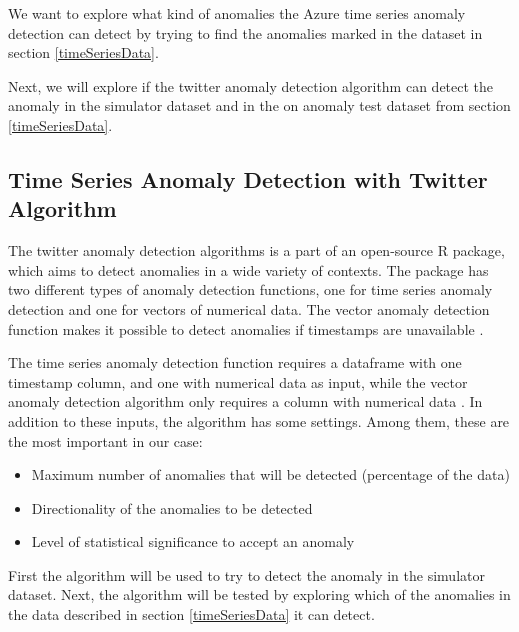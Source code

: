 \documentclass[english, a4paper]{report}
\begin{document}
{{{            We want to explore what kind of anomalies the Azure time series anomaly detection can detect by trying to find the anomalies marked in the dataset in section \ref{timeSeriesData}. 
            \par
            Next, we will explore if the twitter anomaly detection algorithm can detect the anomaly in the simulator dataset and in the on anomaly test dataset from section \ref{timeSeriesData}.
        }
            
        \subsection{Time Series Anomaly Detection with Twitter Algorithm} \label{timeSeriesADTwitter}
        {
            The twitter anomaly detection algorithms is a part of an open-source R package, which aims to detect anomalies in a wide variety of contexts. The package has two different types of anomaly detection functions, one for time series anomaly detection and one for vectors of numerical data. The vector anomaly detection function makes it possible to detect anomalies if timestamps are unavailable \cite{twitterGitHub}. 
            \par
            The time series anomaly detection function requires a dataframe with one timestamp column, and one with numerical data as input, while the vector anomaly detection algorithm only requires a column with numerical data \cite{twitterGitHub}. In addition to these inputs, the algorithm has some settings. Among them, these are the most important in our case:
            \begin{itemize}
                \item Maximum number of anomalies that will be detected (percentage of the data)
                \item Directionality of the anomalies to be detected
                \item Level of statistical significance to accept an anomaly
            \end{itemize}
            First the algorithm will be used to try to detect the anomaly in the simulator dataset. Next, the algorithm will be tested by exploring which of the anomalies in the data described in section \ref{timeSeriesData} it can detect.
        }
    }
    
}
\end{document}
